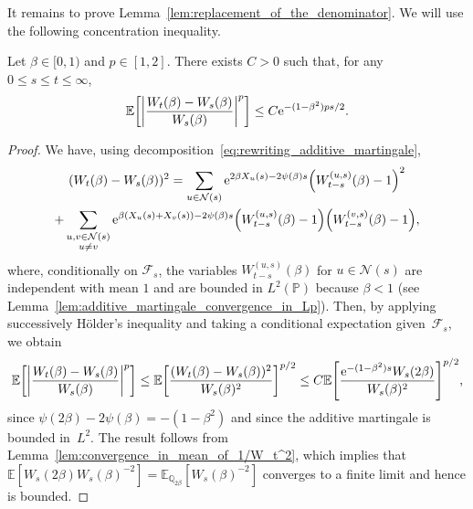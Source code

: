 \documentclass[AHL,Unicode,longabstracts,published]{cedram}
\newcommand{\e}{\mathrm{e}}
\newcommand{\E}{\mathbb{E}}
\renewcommand{\P}{\mathbb{P}}
\newcommand{\Q}{\mathbb{Q}}
\newcommand\1{\mathds{1}}
\newcommand{\cF}{\mathcal{F}}
\newcommand{\cN}{\mathcal{N}}
\newcommand{\Expec}[1]{\mathbb{E}\left[#1\right]}
\let\originalleft\left
\let\originalright\right
\renewcommand{\left}{\mathopen{}\mathclose\bgroup\originalleft}
\renewcommand{\right}{\aftergroup\egroup\originalright}
\begin{document}
It remains to prove Lemma~\ref{lem:replacement_of_the_denominator}. We will use the following concentration inequality.

\begin{lemm}\label{lem:concentration_for_ratio}
Let $\beta \in [0, 1)$ and $p \in [1, 2]$. There exists $C>0$ such that, for any $0 \leq s \leq t \leq \infty$,
\begin{equation*}
\Expec{ \left| \frac{W_t(\beta) - W_s(\beta)}{W_s(\beta)} \right|^p} \leq C \e^{-(1 - \beta^2)ps/2}.
\end{equation*}
\end{lemm}

\begin{proof}
We have, using decomposition~\eqref{eq:rewriting_additive_martingale},
\begin{multline*}
(W_t(\beta) - W_s(\beta))^2= \sum_{u \in \cN(s)} \e^{2\beta X_u(s) - 2\psi(\beta)s} \left(W_{t - s}^{(u, s)}(\beta) - 1\right)^2  \\
+ \sum_{\substack{u, v \in \cN(s)\\ u \neq v}} \e^{\beta(X_u(s) + X_v(s)) - 2\psi(\beta)s} \left(W_{t - s}^{(u, s)}(\beta) - 1\right)\left(W_{t - s}^{(v, s)}(\beta) - 1\right), 
\end{multline*}
where, conditionally on $\cF_s$, the variables $W_{t - s}^{(u,s)}(\beta)$ for $u \in \cN(s)$ are independent with mean $1$ and are bounded in $L^2(\P)$ because $\beta <1$ (see Lemma~\ref{lem:additive_martingale_convergence_in_Lp}). Then, by applying successively H\"older's inequality and taking a conditional expectation given~$\cF_s$, we obtain
\begin{equation*}
\Expec{ \left| \frac{W_t(\beta) - W_s(\beta)}{W_s(\beta)} \right|^p} \leq \Expec{\frac{(W_t(\beta) - W_s(\beta))^2}{W_s(\beta)^2}}^{p/2} \leq C \Expec{\frac{\e^{-(1 - \beta^2)s} W_s(2\beta)}{W_s(\beta)^2}}^{p/2},
\end{equation*}
since $\psi(2\beta) - 2\psi(\beta) = -(1 - \beta^2)$ and since the additive martingale is bounded in~$L^2$. The result follows from Lemma~\ref{lem:convergence_in_mean_of_1/W_t^2}, which implies that $\E[W_s(2\beta) W_s(\beta)^{-2}] = \E_{\Q_{2\beta}}[W_s(\beta)^{-2}]$ converges to a finite limit and hence is bounded.
\end{proof}
\end{document}
